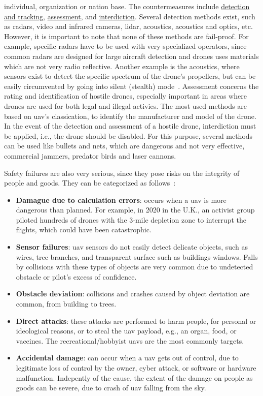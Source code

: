 \begin{itemize}
  individual, organization or nation base. The countermeasures include
  \underline{detection and tracking}, \underline{assessment}, and
  \underline{interdiction}. Several detection methods exist, such as radars,
  video and infrared cameras, \gls{lidar}, acoustics, acoustics and optics,
  etc. However, it is important to note that none of these methods are
  fail-proof. For example, specific radars have to be used with very specialized
  operators, since common radars are designed for large aircraft detection and
  drones uses materials which are not very radio reflective. Another example is
  the acoustics, where sensors exist to detect the specific spectrum of the
  drone's propellers, but can be easily circumvented by going into silent
  (stealth) mode~\cite{sathyamoorthy2015review}. Assessment concerns the rating
  and identification of hostile drones, especially important in areas where
  drones are used for both legal and illegal activies. The most used methods are
  based on \gls{uav}'s classication, to identify the manufacturer and model of
  the drone. In the event of the detection and assessment of a hostile drone,
  interdiction must be applied, i.e., the drone should be disabled. For this
  purpose, several methods can be used like bullets and nets, which are
  dangerous and not very effective, commercial jammers, predator birds and laser
  cannons.
\end{itemize}

Safety failures are also very serious, since they pose risks on the integrity of
people and goods. They can be categorized as follows~\cite{ferrao2020stuart}:
\begin{itemize}
\item \textbf{Damague due to calculation errors}: occurs when a \gls{uav} is
  more dangerous than planned. For example, in 2020 in the U.K., an activist
  group piloted hundreds of drones with the 3-mile depletion zone to interrupt
  the flights, which could have been catastrophic.
\item \textbf{Sensor failures}: \gls{uav} sensors do not easily detect delicate
  objects, such as wires, tree branches, and transparent surface such as
  buildings windows. Falls by collisions with these types of objects are very
  common due to undetected obstacle or pilot's excess of confidence.
\item \textbf{Obstacle deviation}: collisions and crashes caused by object
  deviation are common, from building to trees.
\item \textbf{Direct attacks}: these attacks are performed to harm people, for
  personal or ideological reasons, or to steal the \gls{uav} payload, e.g., an
  organ, food, or vaccines. The recreational/hobbyist \glspl{uav} are the most
  commonly targets.
\item \textbf{Accidental damage}: can occur when a \gls{uav} gets out of
  control, due to legitimate loss of control by the owner, cyber attack, or
  software or hardware malfunction. Indepently of the cause, the extent of the
  damage on people as goods can be severe, due to crash of \gls{uav} falling
  from the sky.
\end{itemize}

